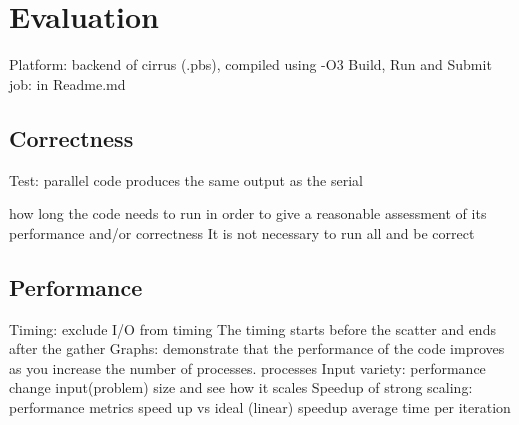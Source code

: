 \documentclass[12pt,a4paper]{article}
\newcommand{\sectionVspacing}{\vspace{15pt}}
\begin{document}
\sectionVspacing

\section{Evaluation}
Platform: backend of cirrus (.pbs), compiled using -O3
Build, Run and Submit job: in Readme.md

\subsection{Correctness}
Test: parallel code produces the same output as the serial

how long the code needs to run in order to give a reasonable assessment of its performance and/or correctness
It is not necessary to run all and be correct

\subsection{Performance}

Timing: exclude I/O from timing The timing starts before the scatter and ends after the gather
Graphs: demonstrate that the performance of the code improves as you increase the number of processes.
	 processes
	 Input variety: performance change input(problem) size and see how it scales
	 Speedup of strong scaling: performance metrics speed up vs ideal (linear) speedup
	 average time per iteration

\sectionVspacing


\end{document}
